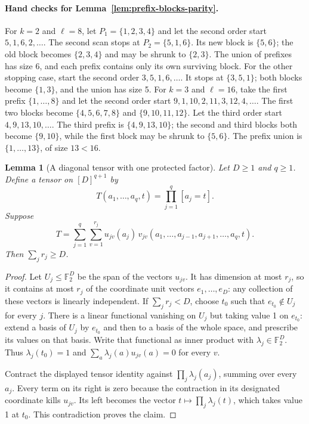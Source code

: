 \documentclass[11pt]{article}
\newtheorem{lemma}[theorem]{Lemma}
\theoremstyle{definition}
\theoremstyle{remark}
\begin{document}
\paragraph{Hand checks for Lemma~\ref{lem:prefix-blocks-parity}.}
For $k=2$ and $\ell=8$, let $P_1=\{1,2,3,4\}$ and let the second order
start $5,1,6,2,\ldots$.  The second scan stops at
$P_2=\{5,1,6\}$.  Its new block is $\{5,6\}$; the old block becomes
$\{2,3,4\}$ and may be shrunk to $\{2,3\}$.
The union of prefixes has size 6, and each prefix contains only its
own surviving block.
For the other stopping case, start the second order $3,5,1,6,\ldots$.
It stops at $\{3,5,1\}$; both blocks become $\{1,3\}$, and the union
has size 5.
For $k=3$ and $\ell=16$, take the first prefix $\{1,\ldots,8\}$ and
let the second order start $9,1,10,2,11,3,12,4,\ldots$.
The first two blocks become $\{4,5,6,7,8\}$ and $\{9,10,11,12\}$.
Let the third order start $4,9,13,10,\ldots$.
The third prefix is $\{4,9,13,10\}$; the second and third blocks both
become $\{9,10\}$, while the first block may be shrunk to $\{5,6\}$.
The prefix union is $\{1,\ldots,13\}$, of size $13<16$.

\begin{lemma}[A diagonal tensor with one protected factor]
\label{lem:protected-diagonal-parity}
Let $D\ge1$ and $q\ge1$.  Define a tensor on $[D]^{q+1}$ by
\[
 T(a_1,\ldots,a_q,t)=\prod_{j=1}^{q}[a_j=t].
\]
Suppose
\[
 T=\sum_{j=1}^{q}\sum_{v=1}^{r_j}
       u_{jv}(a_j)\,v_{jv}(a_1,\ldots,a_{j-1},a_{j+1},\ldots,a_q,t).
\]
Then $\sum_jr_j\ge D$.
\end{lemma}
\begin{proof}
Let $U_j\le\mathbb F_2^D$ be the span of the vectors $u_{jv}$.
It has dimension at most $r_j$, so it contains at most $r_j$ of the
coordinate unit vectors $e_1,\ldots,e_D$: any collection of these
vectors is linearly independent.
If $\sum_jr_j<D$, choose $t_0$ such that $e_{t_0}\notin U_j$ for
every $j$.  There is a linear functional vanishing on $U_j$ but taking
value 1 on $e_{t_0}$: extend a basis of $U_j$ by $e_{t_0}$ and then
to a basis of the whole space, and prescribe its values on that basis.
Write that functional as inner product with $\lambda_j\in\mathbb F_2^D$.
Thus $\lambda_j(t_0)=1$ and
$\sum_a\lambda_j(a)u_{jv}(a)=0$ for every $v$.

Contract the displayed tensor identity against
$\prod_j\lambda_j(a_j)$, summing over every $a_j$.
Every term on its right is zero because the contraction in its
designated coordinate kills $u_{jv}$.
Its left becomes the vector $t\mapsto\prod_j\lambda_j(t)$, which
takes value 1 at $t_0$.  This contradiction proves the claim.
\end{proof}
\end{document}
